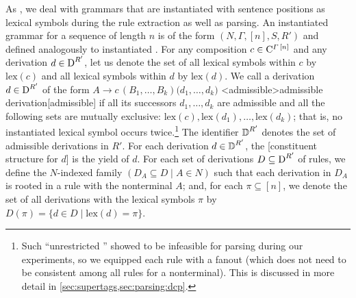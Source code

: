 \documentclass[../../document.tex]{subfiles}
\begin{document}
    As , we deal with  grammars that are instantiated with sentence positions as lexical symbols during the rule extraction as well as parsing.
    An instantiated  grammar for a sequence of length \(n\) is of the form \((N, \varGamma, [n], S, R')\) and defined analogously to instantiated .
    For any composition \(c \in \mathrm{C}^{\varGamma\,[n]}\) and any derivation \(d \in \operatorname{D}^{R'}\), let us denote the set of all lexical symbols within \(c\) by \(\mathrm{lex}(c)\) and all lexical symbols within \(d\) by \(\mathrm{lex}(d)\).
    We call a derivation \(d \in \operatorname{D}^{R'}\) of the form \(A \to c\,(B_1, \ldots, B_k) \big( d_1, \ldots, d_k \big)\) <admissible>{admissible  derivation}[admissible] if all its successors \(d_1, \ldots, d_k\) are admissible and all the following sets are mutually exclusive: \(\mathrm{lex}(c), \mathrm{lex}(d_1), \ldots, \mathrm{lex}(d_k)\); that is, no instantiated lexical symbol occurs twice.\footnote{
        Such ``unrestricted '' showed to be infeasible for parsing during our experiments, so we equipped each rule with a fanout (which does not need to be consistent among all rules for a  nonterminal).
        This is discussed in more detail in \cref{sec:supertags,sec:parsing:dcp}.
    }
    The identifier \(\operatorname{\mathbb{D}}^{R'}\) denotes the set of admissible derivations in \(R'\).
    For each derivation \(d \in \operatorname{\mathbb{D}}^{R'}\), the [constituent structure for \(d\)] is the yield of \(d\).
    For each set of derivations \(D \subseteq \operatorname{D}^{R'}\) of  rules, we define the \(N\)-indexed family \((D_A \subseteq D \mid A \in N)\) such that each derivation in \(D_A\) is rooted in a rule with the  nonterminal \(A\); and, for each \(\pi \subseteq [n]\), we denote the set of all derivations with the lexical symbols \(\pi\) by \(D(\pi) = \{d\in D \mid \mathrm{lex}(d) = \pi\}\).
\end{document}
